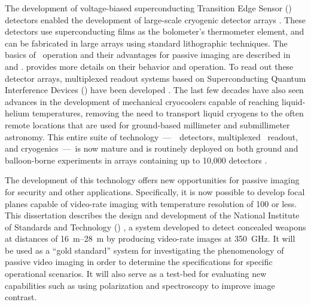 The development of voltage-biased superconducting Transition Edge Sensor (\TES) detectors enabled the development of large-scale cryogenic detector arrays \cite{irwin_application_1995}.
These detectors use superconducting films as the bolometer's thermometer element, and can be fabricated in large arrays using standard lithographic techniques.
The basics of \TES\ operation and their advantages for passive imaging are described in  and .
 provides more details on their behavior and operation.
To read out these detector arrays, multiplexed readout systems based on Superconducting Quantum Interference Devices (\SQUIDs) have been developed \cite{chervenak_superconducting_1999,yoon_single_2001}.
The last few decades have also seen advances in the development of mechanical cryocoolers capable of reaching liquid-helium temperatures, removing the need to transport liquid cryogens to the often remote locations that are used for ground-based millimeter and submillimeter astronomy.
This entire suite of technology~---~\TES\ detectors, multiplexed \SQUID\ readout, and cryogenics~---~is now mature and is routinely deployed on both ground and balloon-borne experiments in arrays containing up to 10,000 detectors \cite{holland_scuba-2:_2013}.

The development of this technology offers new opportunities for passive imaging for security and other applications.
Specifically, it is now possible to develop focal planes capable of video-rate imaging with temperature resolution of \SI{100}{\mK} or less.
This dissertation describes the design and development of the National Institute of Standards and Technology (\NIST) \Imager, a system developed to detect concealed weapons at distances of \SIrange{16}{28}{\m} by producing video-rate images at \SI{350}{\GHz}.
It will be used as a ``gold standard'' system for investigating the phenomenology of passive video imaging in order to determine the specifications for specific operational scenarios.
It will also serve as a test-bed for evaluating new capabilities such as using polarization and spectroscopy to improve image contrast.

